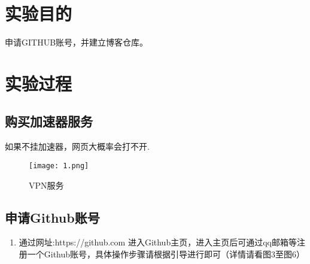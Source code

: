 \documentclass{zjureport}
\date{\zhtoday}
\begin{document}
\makecover
\makeheader

\section{实验目的}
	申请GITHUB账号，并建立博客仓库。
\section{实验过程}
	\subsection{购买加速器服务}
	如果不挂加速器，网页大概率会打不开.
		\begin{figure}[!htbp]
			\centering
			\texttt{[image: 1.png]}
			\caption{VPN服务}
			\label{fig:dist}
		\end{figure}
	\subsection{申请Github账号}
		\begin{enumerate}
			\item{通过网址:https://github.com 进入Github主页，进入主页后可通过qq邮箱等注册一个Github账号，具体操作步骤请根据引导进行即可}（详情请看图3至图6）
		\end{enumerate}
\begin{figure}[htbp]
	\centering
\end{figure}
	
\end{document}
